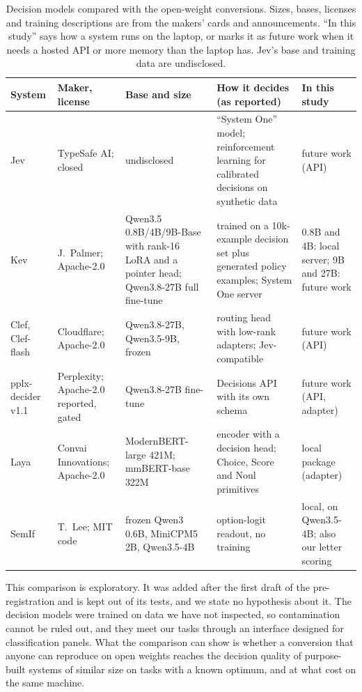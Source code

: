 \begin{table}[t]
\centering\small
\caption{Decision models compared with the open-weight conversions. Sizes, bases, licenses and training descriptions are from the makers' cards and announcements. ``In this study'' says how a system runs on the laptop, or marks it as future work when it needs a hosted API or more memory than the laptop has. Jev's base and training data are undisclosed.}
\label{tab:systems}
\begin{tabularx}{\linewidth}{@{}l l X X X@{}}
\toprule
System & Maker, license & Base and size & How it decides (as reported) & In this study\\
\midrule
Jev \citep{typesafe2026jev} & TypeSafe AI; closed & undisclosed & ``System One'' model; reinforcement learning for calibrated decisions on synthetic data & future work (API)\\
Kev \citep{palmer2026kev} & J.~Palmer; Apache-2.0 & Qwen3.5 0.8B/4B/9B-Base with rank-16 LoRA and a pointer head; Qwen3.8-27B full fine-tune & trained on a 10k-example decision set plus generated policy examples; System One server & 0.8B and 4B: local server; 9B and 27B: future work\\
Clef, Clef-flash \citep{cloudflare2026clef} & Cloudflare; Apache-2.0 & Qwen3.8-27B, Qwen3.5-9B, frozen & routing head with low-rank adapters; Jev-compatible & future work (API)\\
pplx-decider v1.1 \citep{perplexity2026decider} & Perplexity; Apache-2.0 reported, gated & Qwen3.8-27B fine-tune & Decisions API with its own schema & future work (API, adapter)\\
Laya \citep{convai2026laya} & Convai Innovations; Apache-2.0 & ModernBERT-large 421M; mmBERT-base 322M & encoder with a decision head; Choice, Score and Noul primitives & local package (adapter)\\
SemIf \citep{lee2026semif} & T.~Lee; MIT code & frozen Qwen3 0.6B, MiniCPM5 2B, Qwen3.5-4B & option-logit readout, no training & local, on Qwen3.5-4B; also our letter scoring\\
\bottomrule
\end{tabularx}
\end{table}

This comparison is exploratory. It was added after the first draft of the pre-registration and is kept out of its tests, and we state no hypothesis about it. The decision models were trained on data we have not inspected, so contamination cannot be ruled out, and they meet our tasks through an interface designed for classification panels. What the comparison can show is whether a conversion that anyone can reproduce on open weights reaches the decision quality of purpose-built systems of similar size on tasks with a known optimum, and at what cost on the same machine.

